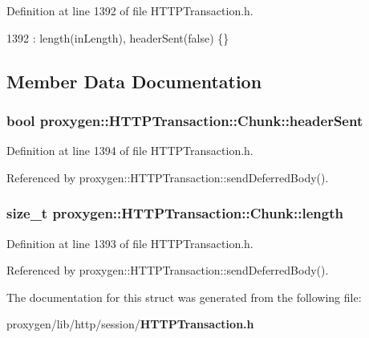 Definition at line 1392 of file H\+T\+T\+P\+Transaction.\+h.


\begin{DoxyCode}
1392 : length(inLength), headerSent(\textcolor{keyword}{false}) \{\}
\end{DoxyCode}


\subsection{Member Data Documentation}
\subsubsection[{header\+Sent}]{\setlength{\rightskip}{0pt plus 5cm}bool proxygen\+::\+H\+T\+T\+P\+Transaction\+::\+Chunk\+::header\+Sent}\label{structproxygen_1_1HTTPTransaction_1_1Chunk_af044d194d523fbce539790e034449240}


Definition at line 1394 of file H\+T\+T\+P\+Transaction.\+h.



Referenced by proxygen\+::\+H\+T\+T\+P\+Transaction\+::send\+Deferred\+Body().

\subsubsection[{length}]{\setlength{\rightskip}{0pt plus 5cm}size\+\_\+t proxygen\+::\+H\+T\+T\+P\+Transaction\+::\+Chunk\+::length}\label{structproxygen_1_1HTTPTransaction_1_1Chunk_abdf4b50799a3323b6bb5417eb4f010cf}


Definition at line 1393 of file H\+T\+T\+P\+Transaction.\+h.



Referenced by proxygen\+::\+H\+T\+T\+P\+Transaction\+::send\+Deferred\+Body().



The documentation for this struct was generated from the following file\+:\begin{DoxyCompactItemize}
\item 
proxygen/lib/http/session/{\bf H\+T\+T\+P\+Transaction.\+h}\end{DoxyCompactItemize}
